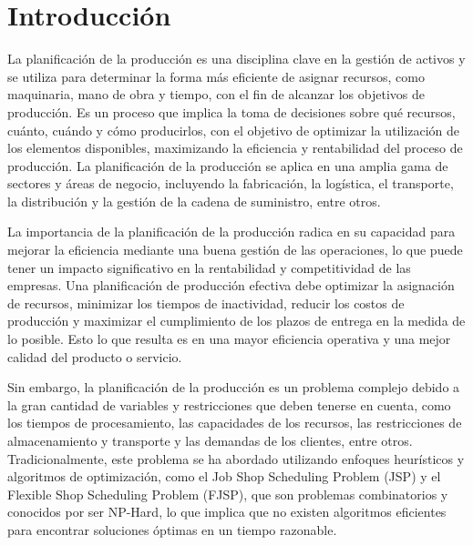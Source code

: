 \section{Introducción}
La planificación de la producción es una disciplina clave en la gestión de 
activos y se utiliza para determinar la forma más eficiente de asignar 
recursos, como maquinaria, mano de obra y tiempo, con el fin de alcanzar 
los objetivos de producción. Es un proceso que implica la toma de decisiones 
sobre qué recursos, cuánto, cuándo y cómo producirlos, con el objetivo de optimizar la 
utilización de los elementos disponibles, maximizando la eficiencia y rentabilidad 
del proceso de producción. La planificación de la producción se aplica en una 
amplia gama de sectores y áreas de negocio, incluyendo la fabricación, la logística, 
el transporte, la distribución y la gestión de la cadena de suministro, entre otros.\medskip

La importancia de la planificación de la producción radica en su capacidad para mejorar 
la eficiencia mediante una buena gestión de las operaciones, lo que puede tener un impacto 
significativo en la rentabilidad y competitividad de las empresas. Una planificación de 
producción efectiva debe optimizar la asignación de recursos, minimizar los tiempos de 
inactividad, reducir los costos de producción y maximizar el cumplimiento de los plazos 
de entrega en la medida de lo posible. Esto lo que resulta es en una mayor eficiencia operativa 
y una mejor calidad del producto o servicio.\medskip

Sin embargo, la planificación de la producción es un problema complejo debido a la gran 
cantidad de variables y restricciones que deben tenerse en cuenta, como los tiempos de 
procesamiento, las capacidades de los recursos, las restricciones de almacenamiento y 
transporte y las demandas de los clientes, entre otros. Tradicionalmente, este problema 
se ha abordado utilizando enfoques heurísticos y algoritmos de optimización, como el 
Job Shop Scheduling Problem (JSP) y el Flexible Shop Scheduling Problem (FJSP), que son problemas 
combinatorios y conocidos por ser NP-Hard, lo que implica que no existen algoritmos eficientes 
para encontrar soluciones óptimas en un tiempo razonable.\medskip

